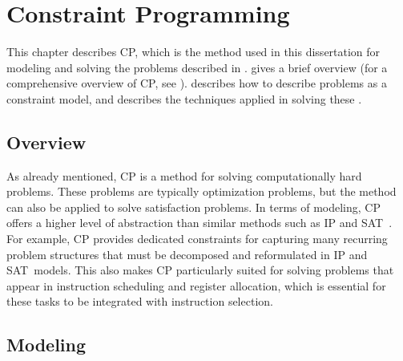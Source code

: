 %

\chapter{Constraint Programming}

This chapter describes \glsdesc{CP}, which is the method used in this
dissertation for modeling and solving the problems described in
.
%
 gives a brief overview (for a comprehensive overview of
\gls{CP}, see \cite{RossiEtAl:2006}).
%
 describes how to describe problems as a \gls{constraint
  model}, and  describes the techniques applied in
solving these .



\section{Overview}

As already mentioned, \glsdesc{CP} is a method for solving computationally hard
problems.
%
These problems are typically optimization problems, but the method can also be
applied to solve satisfaction problems.
%
In terms of modeling, \gls{CP} offers a higher level of abstraction than similar
methods such as \gls{IP} and \gls{SAT}~\cite{BiereEtAl:2009}.
%
For example, \gls{CP} provides dedicated constraints for capturing many
recurring problem structures that must be decomposed and reformulated in
\gls{IP} and \gls{SAT}~models.
%
This also makes \gls{CP} particularly suited for solving problems that appear in
\gls{instruction scheduling} and \gls{register allocation}, which is essential
for these tasks to be integrated with \gls{instruction selection}.



\section{Modeling}

